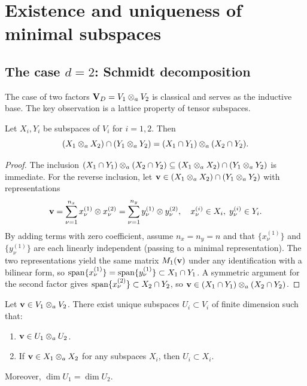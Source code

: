 \section{Existence and uniqueness of minimal subspaces}
\label{sec:min:existence}

\subsection*{The case $d = 2$: Schmidt decomposition}

The case of two factors $\mathbf{V}_D = V_1 \otimes_a V_2$ is classical and serves
as the inductive base. The key observation is a lattice property of
tensor subspaces.

\begin{lemma}
\label{lem:intersection_d2}
Let $X_i, Y_i$ be subspaces of $V_i$ for $i = 1, 2$. Then
\begin{equation}
\label{eq:intersection_d2}
    (X_1 \otimes_a X_2) \cap (Y_1 \otimes_a Y_2)
    = (X_1 \cap Y_1) \otimes_a (X_2 \cap Y_2).
\end{equation}
\end{lemma}

\begin{proof}
The inclusion $(X_1 \cap Y_1) \otimes_a (X_2 \cap Y_2) \subseteq
(X_1 \otimes_a X_2) \cap (Y_1 \otimes_a Y_2)$ is immediate. For the
reverse inclusion, let $\mathbf{v} \in (X_1 \otimes_a X_2) \cap (Y_1 \otimes_a Y_2)$
with representations
\begin{equation*}
    \mathbf{v} = \sum_{\nu=1}^{n_x} x^{(1)}_\nu \otimes x^{(2)}_\nu
       = \sum_{\nu=1}^{n_y} y^{(1)}_\nu \otimes y^{(2)}_\nu,
    \quad
    x^{(i)}_\nu \in X_i,\; y^{(i)}_\nu \in Y_i.
\end{equation*}
By adding terms with zero coefficient, assume $n_x = n_y = n$ and
that $\{x^{(1)}_\nu\}$ and $\{y^{(1)}_\nu\}$ are each linearly
independent (passing to a minimal representation). The two
representations yield the same matrix $M_1(\mathbf{v})$ under any identification
with a bilinear form, so $\mathrm{span}\{x^{(1)}_\nu\} = \mathrm{span}\{y^{(1)}_\nu\}
\subset X_1 \cap Y_1$. A symmetric argument for the second factor gives
$\mathrm{span}\{x^{(2)}_\nu\} \subset X_2 \cap Y_2$, so
$\mathbf{v} \in (X_1 \cap Y_1) \otimes_a (X_2 \cap Y_2)$.
\end{proof}

\begin{proposition}[Minimal subspace: case $d=2$]
\label{prop:min_d2}
Let $\mathbf{v} \in V_1 \otimes_a V_2$. There exist unique subspaces
$U_i \subset V_i$ of finite dimension such that:
\begin{enumerate}
\item[\textup{(i)}] $\mathbf{v} \in U_1 \otimes_a U_2$.
\item[\textup{(ii)}] If $\mathbf{v} \in X_1 \otimes_a X_2$ for any subspaces $X_i$,
    then $U_i \subset X_i$.
\end{enumerate}
Moreover, $\dim U_1 = \dim U_2$.
\end{proposition}

